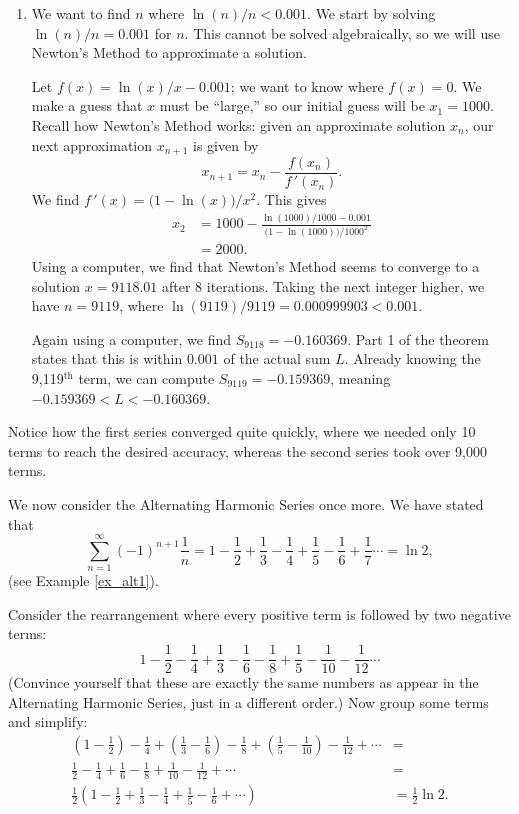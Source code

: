 \documentclass[10pt]{article}
\newcommand{\fp}{\ensuremath{f\,'}}
\begin{document}
{{\begin{enumerate}
	We can use Part 2 of the theorem to obtain an even more accurate result. As we know the $10^\text{th}$ term of the series is $-1/1000$, we can easily compute $S_{10} = 0.901116$. Part 2 of the theorem states that $L$ is between $S_9$ and $S_{10}$, so $0.901116 <L<0.902116$.
	
	
	\item		We want to find $n$ where $\ln (n)/n < 0.001$. We start by solving $\ln (n)/n = 0.001$ for $n$. This cannot be solved algebraically, so we will use Newton's Method to approximate a solution. 
	
	Let $f(x) = \ln(x)/x-0.001$; we want to know where $f(x) = 0$. We make a guess that $x$ must be ``large,'' so our initial guess will be $x_1=1000$. Recall how Newton's Method works: given an approximate solution $x_n$, our next approximation $x_{n+1}$ is given by
	$$x_{n+1} = x_n - \frac{f(x_n)}{\fp(x_n)}.$$
	We find $\fp(x) = \big(1-\ln(x)\big)/x^2$. This gives
	\begin{align*}
	x_2 &= 1000 - \frac{\ln(1000)/1000-0.001}{\big(1-\ln(1000)\big)/1000^2} \\
			&= 2000.
	\end{align*}
	Using a computer, we find that Newton's Method seems to converge to a solution $x=9118.01$ after 8 iterations. Taking the next integer higher, we have $n=9119$, where $\ln(9119)/9119 =0.000999903<0.001$.
	
	Again using a computer, we find $S_{9118} = -0.160369$. Part 1 of the theorem states that this is within $0.001$ of the actual sum $L$. Already knowing the 9,119$^\text{th}$ term, we can compute $S_{9119} = -0.159369$, meaning $-0.159369 < L < -0.160369$. 
	
\end{enumerate}
Notice how the first series converged quite quickly, where we needed only 10 terms to reach the desired accuracy, whereas the second series took over 9,000 terms.
}

We now consider the Alternating Harmonic Series once more. We have stated that 
$$\sum_{n=1}^\infty (-1)^{n+1}\frac1n = 1-\frac12+\frac13-\frac14+\frac15-\frac16+\frac17\cdots = \ln 2,$$
(see Example \ref{ex_alt1}). 

Consider the rearrangement where every positive term is followed by two negative terms:
$$
1-\frac12-\frac14+\frac13-\frac16-\frac18+\frac15-\frac1{10}-\frac1{12}\cdots
$$
(Convince yourself that these are exactly the same numbers as appear in the Alternating Harmonic Series, just in a different order.) Now group some terms and simplify:
\begin{align*}
\left(1-\frac12\right)-\frac14+\left(\frac13-\frac16\right)-\frac18+\left(\frac15-\frac1{10}\right)-\frac1{12}+\cdots &= \\
\frac12-\frac14+\frac16-\frac18+\frac1{10}-\frac{1}{12}+\cdots &= \\
\frac12\left(1-\frac12+\frac13-\frac14+\frac15-\frac16+\cdots\right) & = \frac12\ln 2.
\end{align*}

}
\end{document}
